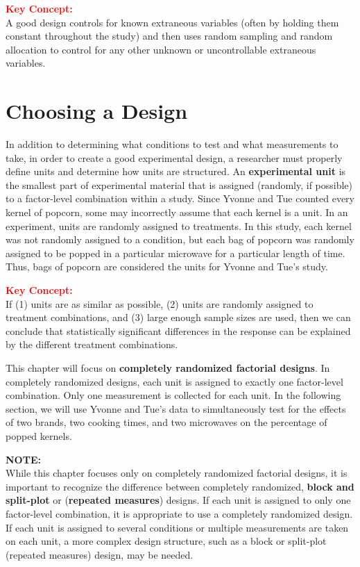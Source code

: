 \documentclass[
]{report}
\begin{document}
\large

\textbf{\textcolor{red}{Key Concept:}}\\
\color{red}
A good design controls for known extraneous variables (often by holding them constant throughout
the study) and then uses random sampling and random allocation to control for any other unknown or
uncontrollable extraneous variables.
\color{black}
\normalsize

\section*{Choosing a Design}\label{choosing-a-design}

In addition to determining what conditions to test and what measurements to take, in order to create a good experimental design, a researcher must properly define units and determine how units are structured. An \textbf{experimental unit} is the smallest part of experimental material that is assigned (randomly, if possible) to a factor-level combination within a study. Since Yvonne and Tue counted every kernel of popcorn, some may incorrectly assume that each kernel is a unit. In an experiment, units are randomly assigned to treatments. In this study, each kernel was not randomly assigned to a condition, but each bag of popcorn was randomly assigned to be popped in a particular microwave for a particular length of time. Thus, bags of popcorn are considered the units for Yvonne and Tue's study.

\large

\textbf{\textcolor{red}{Key Concept:}}\\
\color{red}
If (1) units are as similar as possible, (2) units are randomly assigned to treatment combinations, and (3) large enough sample sizes are used, then we can conclude that statistically significant differences in the response can be explained by the different treatment combinations.
\color{black}
\normalsize

This chapter will focus on \textbf{completely randomized factorial designs}. In completely randomized designs, each unit is assigned to exactly one factor-level combination. Only one measurement is collected for each unit. In the following section, we will use Yvonne and Tue's data to simultaneously test for the effects of two brands, two cooking times, and two microwaves on the percentage of popped kernels.

\large

\textbf{NOTE:}\\
While this chapter focuses only on completely randomized factorial designs, it is important to recognize the difference between completely randomized, \textbf{block and split-plot} or (\textbf{repeated measures}) designs. If each unit is assigned to only one factor-level combination, it is appropriate to use a completely randomized design. If each unit is assigned to several conditions or multiple measurements are taken on each unit, a more complex design structure, such as a block or split-plot (repeated measures) design, may be needed.
\end{document}
